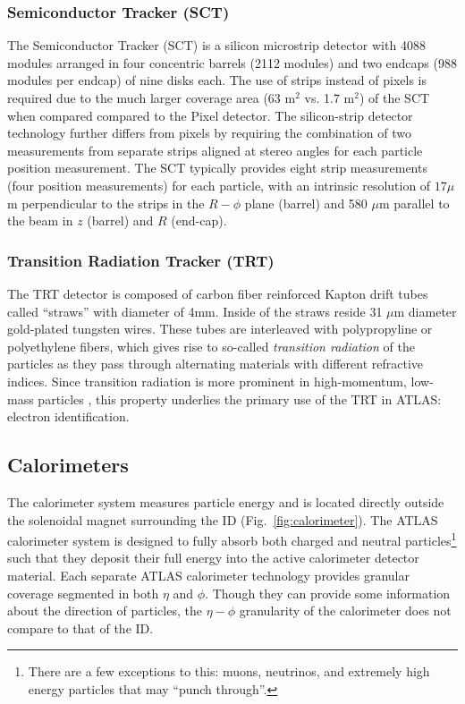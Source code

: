 \subsubsection{Semiconductor Tracker (SCT)}
The Semiconductor Tracker (SCT) is a silicon microstrip detector with 4088 modules arranged in four concentric barrels (2112 modules) and two endcaps (988 modules per endcap) of nine disks each.
The use of strips instead of pixels is required due to the much larger coverage area (63 $\mathrm{m}^2$ vs. 1.7 $\mathrm{m}^2$) of the SCT when compared compared to the Pixel detector.
The silicon-strip detector technology further differs from pixels by requiring the combination of two measurements from separate strips aligned at stereo angles for each particle position measurement.
The SCT typically provides eight strip measurements (four position measurements) for each particle, with an intrinsic resolution of $17 \mu$m perpendicular to the strips in the $R-\phi$ plane (barrel) and 580 $\mu$m parallel to the beam in $z$ (barrel) and $R$ (end-cap).

\subsubsection{Transition Radiation Tracker (TRT)} 
The TRT detector is composed of carbon fiber reinforced Kapton drift tubes called ``straws'' with diameter of 4mm.
Inside of the straws reside 31 $\mu$m diameter gold-plated tungsten wires.
These tubes are interleaved with polypropyline or polyethylene fibers, which gives rise to so-called \textit{transition radiation} of the particles as they pass through alternating materials with different refractive indices.
Since transition radiation is more prominent in high-momentum, low-mass particles \cite{Andronic_2012}, this property underlies the primary use of the TRT in ATLAS: electron identification.

\subsection{Calorimeters}
\label{sec:calorimeters}

The calorimeter system measures particle energy and is located directly outside the solenoidal magnet surrounding the ID (Fig.~\ref{fig:calorimeter}).
The ATLAS calorimeter system is designed to fully absorb both charged and neutral particles\footnote{There are a few exceptions to this: muons, neutrinos, and extremely high energy particles that may ``punch through''.} such that they deposit their full energy into the active calorimeter detector material.
Each separate ATLAS calorimeter technology provides granular coverage segmented in both $\eta$ and $\phi$.
Though they can provide some information about the direction of particles, the $\eta-\phi$ granularity of the calorimeter does not compare to that of the ID.

